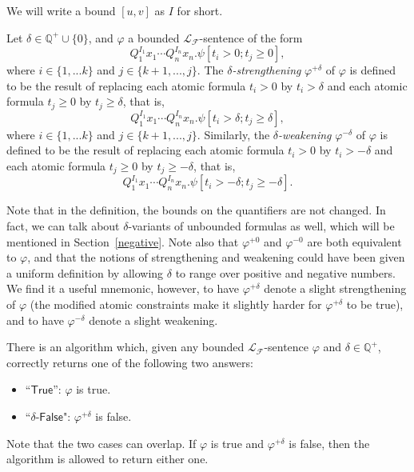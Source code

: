 \documentclass[envcountsect]{llncs}
\begin{document}
We will write a bound $[u,v]$ as $I$ for short. 

\begin{definition}
Let $\delta\in \mathbb{Q}^+\cup\{0\}$, and $\varphi$ a bounded $\mathcal{L}_{\mathcal{F}}$-sentence of the form
$$Q_1^{I_1}x_1\cdots Q_n^{I_n}x_n.\psi[t_i>0; t_j\geq 0],$$
where $i\in\{1,...k\}$ and $j\in\{k+1,...,j\}$. The {\em $\delta$-strengthening} $\varphi^{+\delta}$ of $\varphi$ is defined to be the result of replacing each atomic formula $t_i > 0$ by $t_i > \delta$ and each atomic formula $t_j \geq 0$ by $t_j \geq \delta$, that is,
$$Q_1^{I_1}x_1\cdots Q_n^{I_n}x_n.\psi[t_i>\delta; t_j\geq \delta],$$
where $i\in\{1,...k\}$ and $j\in\{k+1,...,j\}$.
Similarly, the {\em $\delta$-weakening} $\varphi^{-\delta}$ of $\varphi$ is defined to be the result of replacing each atomic formula $t_i > 0$ by $t_i > -\delta$ and each atomic formula $t_j \geq 0$ by $t_j \geq -\delta$, that is,
$$Q_1^{I_1}x_1\cdots Q_n^{I_n}x_n.\psi[t_i>-\delta; t_j\geq -\delta].$$
\end{definition}

Note that in the definition, the bounds on the quantifiers are not changed. In fact, we can talk about $\delta$-variants of unbounded formulas as well, which will be mentioned in Section~\ref{negative}. Note also that $\varphi^{+0}$ and $\varphi^{-0}$ are both equivalent to $\varphi$, and that the notions of strengthening and weakening could have been given a uniform definition by allowing $\delta$ to range over positive and negative numbers. We find it a useful mnemonic, however, to have $\varphi^{+\delta}$ denote a slight strengthening of $\varphi$ (the modified atomic constraints make it slightly harder for $\varphi^{+\delta}$ to be true), and to have $\varphi^{-\delta}$ denote a slight weakening.

\begin{theorem}\label{main}
There is an algorithm which, given any bounded $\mathcal{L}_{\mathcal{F}}$-sentence $\varphi$ and $\delta\in \mathbb{Q}^+$, correctly returns one of the following two answers:
\begin{itemize}
\item ``$\mathsf{True}$'': $\varphi$ is true. 
\item ``$\delta$-$\mathsf{False}$": $\varphi^{+\delta}$ is false. 
\end{itemize}
\end{theorem}

Note that the two cases can overlap. If $\varphi$ is true and $\varphi^{+\delta}$ is false, then the algorithm is allowed to return either one. 
\end{document}
